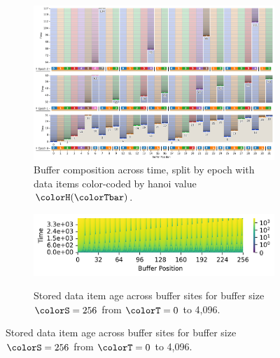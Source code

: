 \begin{figure}[htbp!]
\begin{subfigure}[b]{\linewidth}
\includegraphics[width=\linewidth]{
binder/teeplots/41/num-generations=128+surface-size=32+viz=site-reservation-by-rank-spliced-at-heatmap+ext=.png}
\vspace{-4.5ex}\caption{
  Buffer composition across time, split by epoch with data items color-coded by hanoi value $\colorH(\colorTbar)$.
}
\label{fig:hsurf-stretched-implementation-schematic}
\end{subfigure}

\vspace{0.5ex}
\begin{minipage}[]{\textwidth}
 \vspace{-2pt}
  \begin{subfigure}[t]{0.65\linewidth}
    \vspace{0pt}
    \centering
  \includegraphics[width=0.88\linewidth,clip]{binder/teeplots/41/cnorm=log+num-generations=4096+surface-size=256+viz=site-ingest-depth-by-rank-heatmap+ynorm=linear+ext=.png}  %
  \end{subfigure}%
  \begin{subfigure}[t]{0.35\linewidth}
  \vspace{-2pt}
  \caption{%
    \footnotesize
    Stored data item age across buffer sites for buffer size $\colorS=256$ from $\colorT=0$ to 4,096.
  }
  \label{fig:hsurf-stretched-implementation-heatmap}
\end{subfigure}
\end{minipage}


\end{figure}

